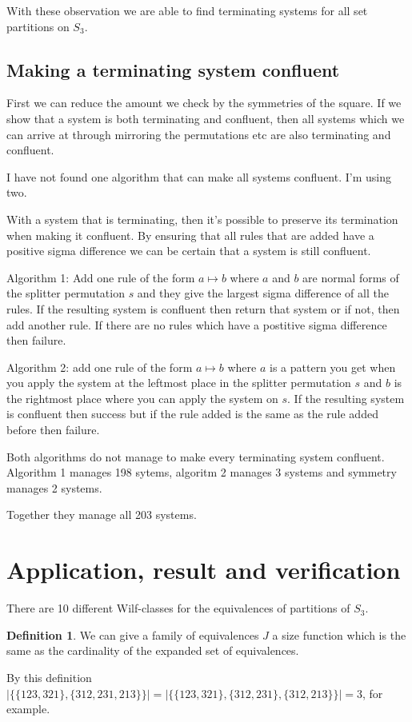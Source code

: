 \documentclass[openany, a4paper, 11pt, english]{article}
\newcommand{\patternrule}{ \mapsto \!}
\theoremstyle{definition}
\newtheorem{definition}[theorem]{Definition}
\newcommand{\Sym}{S}
\begin{document}
With these observation we are able to find terminating systems for all set
partitions on $\Sym_3$.

\subsection{Making a terminating system confluent}
First we can reduce the amount we check by the symmetries of the square.
If we show that a system is both terminating and confluent, then all systems
which we can arrive at through mirroring the permutations etc are also
terminating and confluent.

I have not found one algorithm that can make all systems confluent.
I'm using two.

With a system that is terminating, then it's possible to preserve its
termination when making it confluent.
By ensuring that all rules that are added have a positive sigma difference
we can be certain that a system is still confluent. 

Algorithm 1:
Add one rule of the form $a \patternrule b$ where $a$ and $b$ are normal forms
of the splitter permutation $s$ and they give the largest sigma difference of
all the rules. If the resulting system is confluent then return that system or
if not, then add another rule. If there are no rules which have a postitive
sigma difference then failure.

Algorithm 2:
add one rule of the form $a \patternrule b$ where $a$ is a pattern you get when
you apply the system at the leftmost place in the splitter permutation $s$ and
$b$ is the rightmost place where you can apply the system on $s$. If the
resulting system is confluent then success but if the rule added is the same as
the rule added before then failure.

Both algorithms do not manage to make every terminating system confluent.
Algorithm 1 manages 198 sytems, algoritm 2 manages 3 systems and symmetry
manages 2 systems.

Together they manage all 203 systems.

\section{Application, result and verification}
There are 10 different Wilf-classes for the equivalences of partitions of $S_3$.

\begin{definition}
    We can give a family of equivalences $J$ a size function which is the same
    as the cardinality of the expanded set of equivalences.

    By this definition $| \{ \{ 123, 321 \}, \{ 312, 231, 213 \} \}| = | \{ \{
    123, 321 \}, \{ 312, 231 \}, \{ 312, 213 \} \} | = 3$, for example.
\end{definition}
\end{document}
